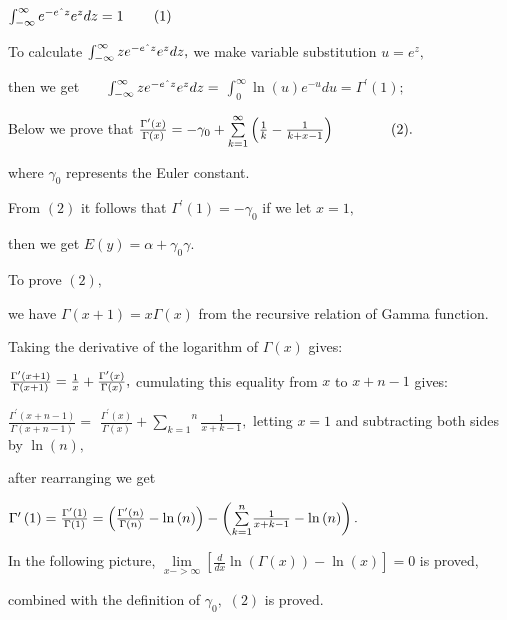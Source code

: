 \documentclass{article}
\begin{document}
$\int_{-\infty }^{\infty }e^{-e\symbol{94}z}e^{z}dz=1\qquad \left( 1\right) $

To calculate $\int_{-\infty }^{\infty }ze^{-e\symbol{94}z}e^{z}dz,$ we make
variable substitution $u=e^{z},$

then we get$\qquad \int_{-\infty }^{\infty }ze^{-e\symbol{94}z}e^{z}dz=$ $%
\int_{0}^{\infty }\ln \left( u\right) e^{-u}du=\Gamma ^{\prime }\left(
1\right) ;$

Below we prove that $\frac{\Gamma ^{\prime }\left( x\right) }{\Gamma \left(
x\right) }=-\gamma _{0}+\overset{\infty }{\underset{k=1}{\sum }}\left( \frac{%
1}{k}-\frac{1}{k+x-1}\right) \qquad \qquad (2).$

where $\gamma _{0}$ represents the Euler constant.

From $\left( 2\right) $ it follows that $\Gamma ^{\prime }\left( 1\right)
=-\gamma _{0}$ if we let $x=1,$

then we get $E\left( y\right) =\alpha +\gamma _{0}\gamma .$

To prove $\left( 2\right) ,$

we have $\Gamma \left( x+1\right) =x\Gamma \left( x\right) $ from the
recursive relation of Gamma function.

Taking the derivative of the logarithm of $\Gamma \left( x\right) $ gives:

$\frac{\Gamma ^{\prime }\left( x+1\right) }{\Gamma \left( x+1\right) }=\frac{%
1}{x}+\frac{\Gamma ^{\prime }\left( x\right) }{\Gamma \left( x\right) },$%
cumulating this equality from $x$ to $x+n-1$ gives:

$\frac{\Gamma ^{\prime }\left( x+n-1\right) }{\Gamma \left( x+n-1\right) }=$ 
$\frac{\Gamma ^{\prime }\left( x\right) }{\Gamma \left( x\right) }+\overset{n%
}{\underset{k=1}{\sum }}\frac{1}{x+k-1},$ letting $x=1$ and subtracting both
sides by $\ln \left( n\right) ,$

after rearranging we get

$\Gamma ^{\prime }\left( 1\right) =\frac{\Gamma ^{\prime }\left( 1\right) }{%
\Gamma \left( 1\right) }=\left( \frac{\Gamma ^{\prime }\left( n\right) }{%
\Gamma \left( n\right) }-\ln \left( n\right) \right) -\left( \overset{n}{%
\underset{k=1}{\sum }}\frac{1}{x+k-1}-\ln \left( n\right) \right) .$

In the following picture, $\underset{x->\infty }{\lim }\left[ \frac{d}{dx}%
\ln \left( \Gamma \left( x\right) \right) -\ln \left( x\right) \right] =0$
is proved,

combined with the definition of $\gamma _{0},$ $\left( 2\right) $ is proved.
\end{document}
